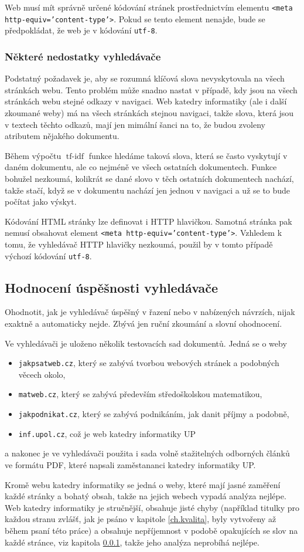 \documentclass[12pt]{article}
\newcommand{\code}[1]{\texttt{#1}}
\newcommand{\ssection}[1]{\subsection{#1}}
\newcommand{\sssection}[1]{\subsubsection{#1}}
\DeclareMathOperator{\tfidf}{tf-idf}
\begin{document}
Web musí mít správně určené kódování stránek prostřednictvím elementu \code{<meta http-equiv='content-type'>}. Pokud se tento element nenajde, bude se předpokládat, že web je v kódování \code{utf-8}. 

\sssection{Některé nedostatky vyhledávače}\label{ch.nedostatky}

Podstatný požadavek je, aby se rozumná klíčová slova nevyskytovala na všech stránkách webu. Tento problém může snadno nastat v případě, kdy jsou na všech stránkách webu stejné odkazy v navigaci. Web katedry informatiky (ale i další zkoumané weby) má na všech stránkách stejnou navigaci, takže slova, která jsou v textech těchto odkazů, mají jen mimální šanci na to, že budou zvoleny atributem nějakého dokumentu. 

Během výpočtu $\tfidf$ funkce hledáme taková slova, která se často vyskytují v daném dokumentu, ale co nejméně ve všech ostatních dokumentech. Funkce bohužel nezkoumá, kolikrát se dané slovo v těch ostatních dokumentech nachází, takže stačí, když se v dokumentu nachází jen jednou v navigaci a už se to bude počítat jako výskyt. 

Kódování HTML stránky lze definovat i HTTP hlavičkou. Samotná stránka pak nemusí obsahovat element \code{<meta http-equiv='content-type'>}. Vzhledem k tomu, že vyhledávač HTTP hlavičky nezkoumá, použil by v tomto případě výchozí kódování \code{utf-8}. 

\ssection{Hodnocení úspěšnosti vyhledávače}
Ohodnotit, jak je vyhledávač úspěšný v řazení nebo v nabízených návrzích, nijak exaktně a automaticky nejde. Zbývá jen ruční zkoumání a slovní ohodnocení. 

Ve vyhledávači je uloženo několik testovacích sad dokumentů. Jedná se o weby 
\begin{itemize}
	\item \code{jakpsatweb.cz}, který se zabývá tvorbou webových stránek a podobných věcech okolo, 
	\item \code{matweb.cz}, který se zabývá především středoškolskou matematikou,
	\item \code{jakpodnikat.cz}, který se zabývá podnikáním, jak danit příjmy a podobně,
	\item \code{inf.upol.cz}, což je web katedry informatiky UP
\end{itemize}
a nakonec je ve vyhledávači použita i sada volně stažitelných odborných článků ve formátu PDF, které napsali zaměstananci katedry informatiky UP. 

Kromě webu katedry informatiky se jedná o weby, které mají jasné zaměření každé stránky a bohatý obsah, takže na jejich webech vypadá analýza nejlépe. Web katedry informatiky je stručnější, obsahuje jisté chyby (například titulky pro každou stranu zvlášť, jak je psáno v kapitole \ref{ch.kvalita}, byly vytvořeny až během psaní této práce) a obsahuje nepříjemnost v podobě opakujících se slov na každé stránce, viz kapitola \ref{ch.nedostatky}, takže jeho analýza neprobíhá nejlépe. 
\end{document}
